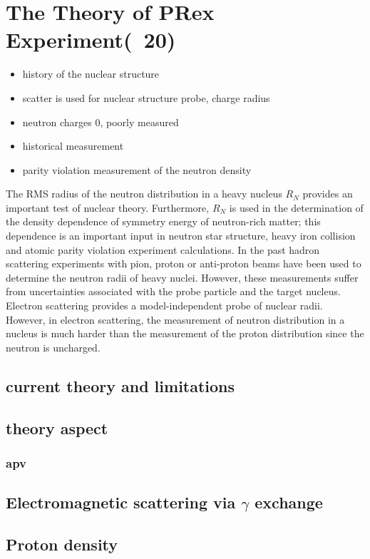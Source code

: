 \chapter{The Theory of PRex Experiment(~20)}
\begin{itemize}
    \item history of the nuclear structure
    \item scatter is used for nuclear structure probe, charge radius 
    \item neutron charges 0, poorly measured
    \item historical measurement 
    \item parity violation measurement of the neutron density
\end{itemize}

The RMS radius of the  neutron distribution in a heavy nucleus  $R_N$ provides an important test of nuclear theory. Furthermore,   $R_N$ is used in the determination of  the density dependence of symmetry energy of neutron-rich matter; this dependence is an  important input in   neutron star structure, heavy iron collision and atomic parity violation experiment calculations. In the past hadron scattering experiments with pion, proton or anti-proton beams have been used to determine the neutron radii of heavy nuclei. However, these measurements suffer from uncertainties associated with the probe particle and the target nucleus. Electron scattering provides a model-independent probe of nuclear radii.  However, in electron scattering, the measurement of neutron distribution in a nucleus  is much harder than the measurement of the proton distribution  since the neutron is uncharged. 
\section{current theory and limitations}
\section{theory aspect}
\subsection{apv}
\section{Electromagnetic scattering via $\gamma$ exchange}
\section{Proton density}
